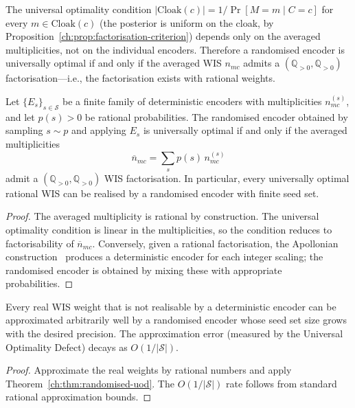 The universal optimality condition
$|\mathrm{Cloak}(c)| = 1/\Pr[M=m\mid C=c]$
for every $m\in\mathrm{Cloak}(c)$ (the posterior is uniform on the
cloak, by Proposition~\ref{ch:prop:factorisation-criterion})
depends only on the averaged multiplicities, not on the individual
encoders.  Therefore a randomised encoder is universally optimal
if and only if the averaged WIS $n_{mc}$ admits a
$(\mathbb Q_{>0},\mathbb Q_{>0})$ factorisation---i.e., the
factorisation exists with rational weights.

\begin{theorem}
\label{ch:thm:randomised-uod}
Let $\{E_s\}_{s\in\mathcal S}$ be a finite family of deterministic
encoders with multiplicities $n_{mc}^{(s)}$, and let
$p(s)>0$ be rational probabilities.  The randomised encoder
obtained by sampling $s\sim p$ and applying $E_s$ is universally
optimal if and only if the averaged multiplicities
\[
\overline n_{mc} = \sum_s p(s)\,n_{mc}^{(s)}
\]
admit a $(\mathbb Q_{>0},\mathbb Q_{>0})$ WIS factorisation.
In particular, every universally optimal rational WIS can be
realised by a randomised encoder with finite seed set.
\end{theorem}

\begin{proof}
The averaged multiplicity is rational by construction.  The
universal optimality condition is linear in the multiplicities,
so the condition reduces to factorisability of $\overline n_{mc}$.
Conversely, given a rational factorisation, the Apollonian
construction~\cite{biondi2018apollonian} produces a deterministic
encoder for each integer scaling; the randomised encoder is
obtained by mixing these with appropriate probabilities.
\end{proof}

\begin{corollary}\label{ch:cor:rational-approx}
Every real WIS weight that is not realisable by a deterministic
encoder can be approximated arbitrarily well by a randomised
encoder whose seed set size grows with the desired precision.
The approximation error (measured by the Universal Optimality
Defect) decays as $O(1/|\mathcal S|)$.
\end{corollary}

\begin{proof}
Approximate the real weights by rational numbers and apply
Theorem~\ref{ch:thm:randomised-uod}.  The $O(1/|\mathcal S|)$
rate follows from standard rational approximation bounds.
\end{proof}

